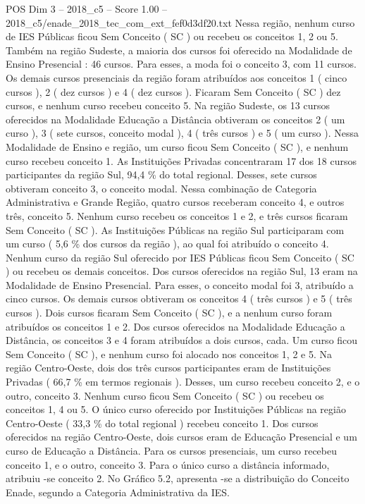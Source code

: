 \begin{textsample}{POS Dim 3 – 2018\_c5 – Score 1.00 – 2018\_c5/enade\_2018\_tec\_com\_ext\_fef0d3df20.txt}
Nessa região, nenhum curso de IES Públicas ficou Sem Conceito ( SC ) ou recebeu os conceitos 1, 2 ou 5.
Também na região Sudeste, a maioria dos cursos foi oferecido na Modalidade de Ensino Presencial : 46 cursos.
Para esses, a moda foi o conceito 3, com 11 cursos.
Os demais cursos presenciais da região foram atribuídos aos conceitos 1 ( cinco cursos ), 2 ( dez cursos ) e 4 ( dez cursos ).
Ficaram Sem Conceito ( SC ) dez cursos, e nenhum curso recebeu conceito 5.
Na região Sudeste, os 13 cursos oferecidos na Modalidade Educação a Distância obtiveram os conceitos 2 ( um curso ), 3 ( sete cursos, conceito modal ), 4 ( três cursos ) e 5 ( um curso ).
Nessa Modalidade de Ensino e região, um curso ficou Sem Conceito ( SC ), e nenhum curso recebeu conceito 1.
As Instituições Privadas concentraram 17 dos 18 cursos participantes da região Sul, 94,4 \% do total regional.
Desses, sete cursos obtiveram conceito 3, o conceito modal.
Nessa combinação de Categoria Administrativa e Grande Região, quatro cursos receberam conceito 4, e outros três, conceito 5.
Nenhum curso recebeu os conceitos 1 e 2, e três cursos ficaram Sem Conceito ( SC ).
As Instituições Públicas na região Sul participaram com um curso ( 5,6 \% dos cursos da região ), ao qual foi atribuído o conceito 4.
Nenhum curso da região Sul oferecido por IES Públicas ficou Sem Conceito ( SC ) ou recebeu os demais conceitos.
Dos cursos oferecidos na região Sul, 13 eram na Modalidade de Ensino Presencial.
Para esses, o conceito modal foi 3, atribuído a cinco cursos.
Os demais cursos obtiveram os conceitos 4 ( três cursos ) e 5 ( três cursos ).
Dois cursos ficaram Sem Conceito ( SC ), e a nenhum curso foram atribuídos os conceitos 1 e 2.
Dos cursos oferecidos na Modalidade Educação a Distância, os conceitos 3 e 4 foram atribuídos a dois cursos, cada.
Um curso ficou Sem Conceito ( SC ), e nenhum curso foi alocado nos conceitos 1, 2 e 5.
Na região Centro-Oeste, dois dos três cursos participantes eram de Instituições Privadas ( 66,7 \% em termos regionais ).
Desses, um curso recebeu conceito 2, e o outro, conceito 3.
Nenhum curso ficou Sem Conceito ( SC ) ou recebeu os conceitos 1, 4 ou 5.
O único curso oferecido por Instituições Públicas na região Centro-Oeste ( 33,3 \% do total regional ) recebeu conceito 1.
Dos cursos oferecidos na região Centro-Oeste, dois cursos eram de Educação Presencial e um curso de Educação a Distância.
Para os cursos presenciais, um curso recebeu conceito 1, e o outro, conceito 3.
Para o único curso a distância informado, atribuiu -se conceito 2.
No Gráfico 5.2, apresenta -se a distribuição do Conceito Enade, segundo a Categoria Administrativa da IES.

\end{textsample}

